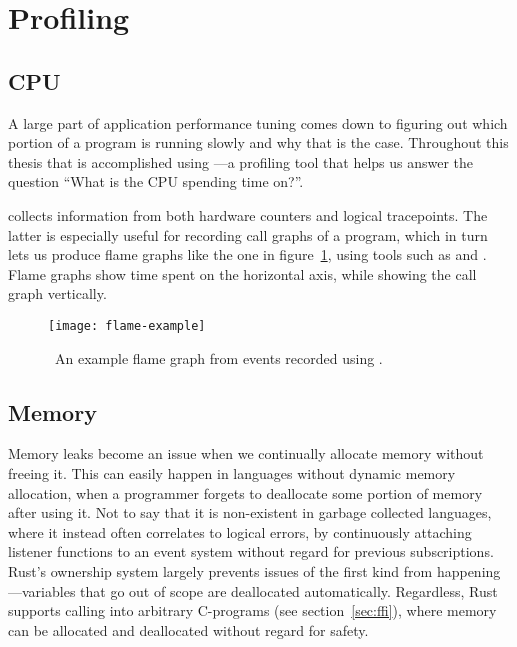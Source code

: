 \section{Profiling}

\subsection{CPU}

A large part of application performance tuning comes down to figuring out which
portion of a program is running slowly and why that is the case. Throughout
this thesis that is accomplished using
---a profiling tool that helps us
answer the question ``What is the CPU spending time on?''.

 collects information from both hardware counters and logical
tracepoints. The latter is especially useful for recording call graphs of a
program, which in turn lets us produce flame graphs like the one in
figure~\ref{fig:flame-example}, using tools such as
 and
. Flame graphs show
time spent on the horizontal axis, while showing the call graph vertically.

\begin{figure}[H]
  \centering
  \texttt{[image: flame-example]}
  \caption{\
    An example flame graph from events recorded using .
  }\label{fig:flame-example}
\end{figure}

\subsection{Memory}

Memory leaks become an issue when we continually allocate memory without freeing
it. This can easily happen in languages without dynamic memory allocation, when
a programmer forgets to deallocate some portion of memory after using it. Not to
say that it is non-existent in garbage collected languages, where it instead
often correlates to logical errors, \eg by continuously attaching listener
functions to an event system without regard for previous subscriptions. Rust's
ownership system largely prevents issues of the first kind from
happening---variables that go out of scope are deallocated automatically.
Regardless, Rust supports calling into arbitrary C-programs (see
section~\ref{sec:ffi}), where memory can be allocated and deallocated without
regard for safety.


